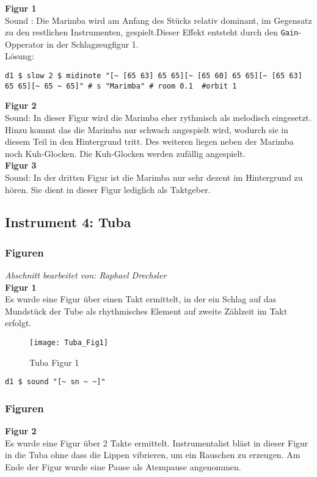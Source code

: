 \documentclass[
10pt, %
a4paper, %
oneside, %
headinclude,footinclude, %
BCOR5mm, %
]{scrartcl}
\begin{document}
\noindent \textbf{Figur 1}\\
Sound : Die Marimba wird am Anfang des Stücks relativ dominant, im Gegensatz zu den restlichen Instrumenten, gespielt.Dieser Effekt entsteht durch den \verb|Gain|-Opperator in der Schlagzeugfigur 1.\\
Lösung:
\begin{lstlisting}
d1 $ slow 2 $ midinote "[~ [65 63] 65 65][~ [65 60] 65 65][~ [65 63] 65 65][~ 65 ~ 65]" # s "Marimba" # room 0.1  #orbit 1
\end{lstlisting}
\noindent \textbf{Figur 2}\\
Sound: In dieser Figur wird die Marimba eher rythmisch als melodisch eingesetzt. Hinzu kommt das die Marimba nur schwach angespielt wird, wodurch sie in diesem Teil in den Hintergrund tritt. Des weiteren liegen neben der Marimba noch Kuh-Glocken. Die Kuh-Glocken werden zufällig angespielt.\\
\noindent \textbf{Figur 3}\\
Sound: In der dritten Figur ist die Marimba nur sehr dezent im Hintergrund zu hören. Sie dient in dieser Figur lediglich als Taktgeber.\\
\subsection{Instrument 4: Tuba}
\subsubsection{Figuren}
\textit{Abschnitt bearbeitet von: Raphael Drechsler}\\

\noindent\textbf{Figur 1}\\
Es wurde eine Figur über einen Takt ermittelt, in der ein Schlag auf das Mundstück der Tube als rhythmisches Element auf zweite Zählzeit im Takt erfolgt.\\
\begin{figure}[h]
	\centering 
	\texttt{[image: Tuba\_Fig1]} 
	\caption{Tuba Figur 1}
\end{figure}

\begin{lstlisting}
d1 $ sound "[~ sn ~ ~]"
\end{lstlisting}

\subsubsection{Figuren}
\textbf{Figur 2}\\
Es wurde eine Figur über 2 Takte ermittelt. Instrumentalist bläst in dieser Figur in die Tuba ohne dass die Lippen vibrieren, um ein Rauschen zu erzeugen. Am Ende der Figur wurde eine Pause als Atempause angenommen. 
\end{document}
